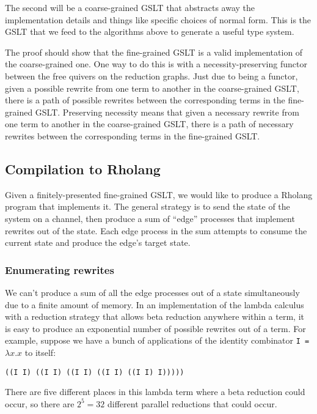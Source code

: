 \documentclass{article}
\begin{document}
The second will be a coarse-grained GSLT that abstracts away the implementation details and things like specific choices of normal form.  This is the GSLT that we feed to the algorithms above to generate a useful type system.

The proof should show that the fine-grained GSLT is a valid implementation of the coarse-grained one.  One way to do this is with a necessity-preserving functor between the free quivers on the reduction graphs.  Just due to being a functor, given a possible rewrite from one term to another in the coarse-grained GSLT, there is a path of possible rewrites between the corresponding terms in the fine-grained GSLT. Preserving necessity means that given a necessary rewrite from one term to another in the coarse-grained GSLT, there is a path of necessary rewrites between the corresponding terms in the fine-grained GSLT.

\subsection{Compilation to Rholang}
\label{comp_to_rholang}

Given a finitely-presented fine-grained GSLT, we would like to produce a Rholang program that implements it.  The general strategy is to send the state of the system on a channel, then produce a sum of ``edge'' processes that implement rewrites out of the state.  Each edge process in the sum attempts to consume the current state and produce the edge's target state.

\subsubsection{Enumerating rewrites}
\label{enum_rewrites}

We can't produce a sum of all the edge processes out of a state simultaneously due to a finite amount of memory.  In an implementation of the lambda calculus with a reduction strategy that allows beta reduction anywhere within a term, it is easy to produce an exponential number of possible rewrites out of a term.  For example, suppose we have a bunch of applications of the identity combinator \verb+I = +$\lambda x.x$ to itself:

\begin{verbatim}
((I I) ((I I) ((I I) ((I I) ((I I) I)))))
\end{verbatim}

There are five different places in this lambda term where a beta reduction could occur, so there are $2^5 = 32$ different parallel reductions that could occur.
\end{document}
